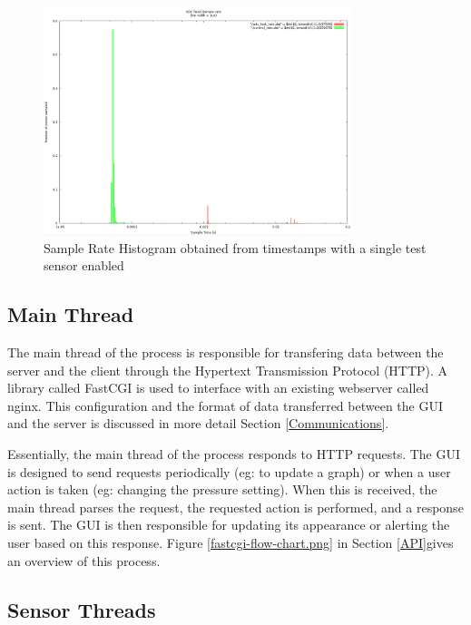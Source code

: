 \begin{figure}[H]
	\centering
	\includegraphics[width=0.8\textwidth]{figures/sample_rate_histogram.png}
	\caption{Sample Rate Histogram obtained from timestamps with a single test sensor enabled}
	\label{sample_rate_histogram.png}
\end{figure}


\subsection{Main Thread}\label{Main Thread}

The main thread of the process is responsible for transfering data between the server and the client through the Hypertext Transmission Protocol (HTTP). A library called FastCGI is used to interface with an existing webserver called nginx\cite{nginx}. This configuration and the format of data transferred between the GUI and the server is discussed in more detail Section \ref{Communications}.

Essentially, the main thread of the process responds to HTTP requests. The GUI is designed to send requests periodically (eg: to update a graph) or when a user action is taken (eg: changing the pressure setting). When this is received, the main thread parses the request, the requested action is performed, and a response is sent. The GUI is then responsible for updating its appearance or alerting the user based on this response. Figure \ref{fastcgi-flow-chart.png} in Section \ref{API}gives an overview of this process.


\subsection{Sensor Threads}\label{Sensor Thread}


